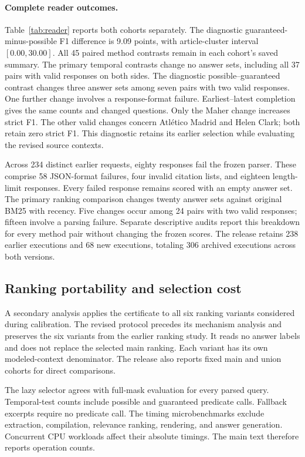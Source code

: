 \paragraph{Complete reader outcomes.}
Table~\ref{tab:reader} reports both cohorts separately.
The diagnostic guaranteed-minus-possible F1 difference is 9.09 points, with article-cluster interval $[0.00,30.00]$.
All 45 paired method contrasts remain in each cohort's saved summary.
The primary temporal contrasts change no answer sets, including all 37 pairs with valid responses on both sides.
The diagnostic possible--guaranteed contrast changes three answer sets among seven pairs with two valid responses.
One further change involves a response-format failure.
Earliest--latest completion gives the same counts and changed questions.
Only the Maher change increases strict F1.
The other valid changes concern Atl\'etico Madrid and Helen Clark; both retain zero strict F1.
This diagnostic retains its earlier selection while evaluating the revised source contexts.

Across 234 distinct earlier requests, eighty responses fail the frozen parser.
These comprise 58 JSON-format failures, four invalid citation lists, and eighteen length-limit responses.
Every failed response remains scored with an empty answer set.
The primary ranking comparison changes twenty answer sets against original BM25 with recency.
Five changes occur among 24 pairs with two valid responses; fifteen involve a parsing failure.
Separate descriptive audits report this breakdown for every method pair without changing the frozen scores.
The release retains 238 earlier executions and 68 new executions, totaling 306 archived executions across both versions.

\subsection{Ranking portability and selection cost}
A secondary analysis applies the certificate to all six ranking variants considered during calibration.
The revised protocol precedes its mechanism analysis and preserves the six variants from the earlier ranking study.
It reads no answer labels and does not replace the selected main ranking.
Each variant has its own modeled-context denominator.
The release also reports fixed main and union cohorts for direct comparisons.

The lazy selector agrees with full-mask evaluation for every parsed query.
Temporal-test counts include possible and guaranteed predicate calls.
Fallback excerpts require no predicate call.
The timing microbenchmarks exclude extraction, compilation, relevance ranking, rendering, and answer generation.
Concurrent CPU workloads affect their absolute timings.
The main text therefore reports operation counts.

